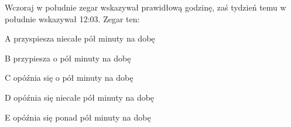 \begin{tresc}
Wczoraj w południe zegar wskazywał prawidłową godzinę, zaś tydzień temu w południe wskazywał 12:03. Zegar ten:
\end{tresc}
\begin{wariant}{A} przyspiesza niecałe pół minuty na dobę \end{wariant}
\begin{wariant}{B} przypiesza o pół minuty na dobę \end{wariant}
\begin{wariant}{C} opóźnia się o pół minuty na dobę \end{wariant}
\begin{wariant}{D} opóźnia się niecałe pół minuty na dobę \end{wariant}
\begin{wariant}{E} opóźnia się ponad pół minuty na dobę \end{wariant}
